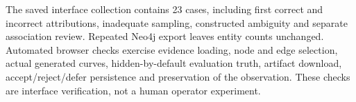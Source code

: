 The saved interface collection contains 23 cases, including first correct and incorrect attributions, inadequate sampling, constructed ambiguity and separate association review. Repeated Neo4j export leaves entity counts unchanged. Automated browser checks exercise evidence loading, node and edge selection, actual generated curves, hidden-by-default evaluation truth, artifact download, accept/reject/defer persistence and preservation of the observation. These checks are interface verification, not a human operator experiment.
